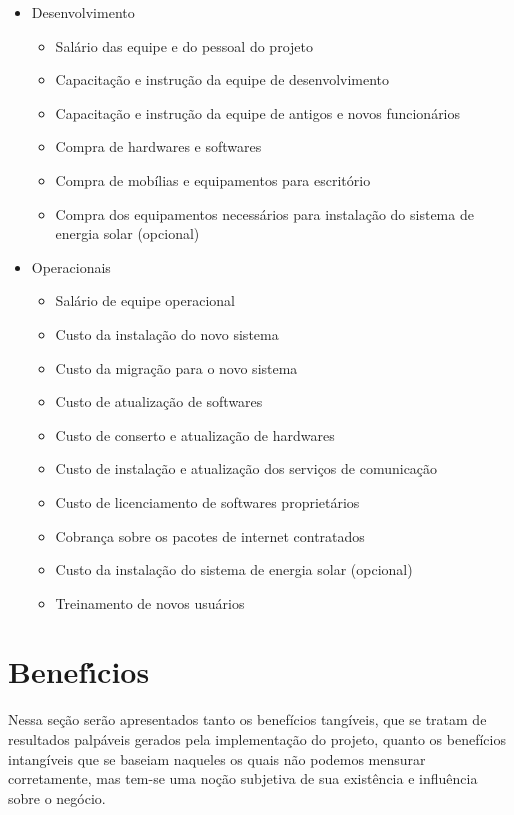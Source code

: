 \begin{itemize}
\item Desenvolvimento 
	\begin{itemize}
	\item Salário das equipe e do pessoal do projeto
	\item Capacitação e instrução da equipe de desenvolvimento 
	\item Capacitação e instrução da equipe de antigos e novos funcionários
	\item Compra de hardwares e softwares
	\item Compra de mobílias e equipamentos para escritório 
	\item Compra dos equipamentos necessários para instalação do sistema de energia solar (opcional)
	\end{itemize}
\item Operacionais
	\begin{itemize}
	\item Salário de equipe operacional 
	\item Custo da instalação do novo sistema
	\item Custo da migração para o novo sistema
	\item Custo de atualização de softwares
	\item Custo de conserto e atualização de hardwares
	\item Custo de instalação e atualização dos serviços de comunicação 
	\item Custo de licenciamento de softwares proprietários
	\item Cobrança sobre os pacotes de internet contratados
	\item Custo da instalação do sistema de energia solar (opcional)
	\item Treinamento de novos usuários
	\end{itemize}
\end{itemize}

\section{Benef\'{\i}cios}
Nessa seção serão apresentados tanto os benefícios tangíveis, que se tratam de resultados palpáveis gerados pela implementação do projeto, quanto os benefícios intangíveis que se baseiam naqueles os quais não podemos mensurar corretamente, mas tem-se uma noção subjetiva de sua existência e influência sobre o negócio.

